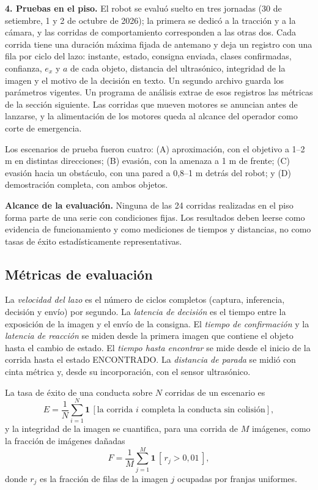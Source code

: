 \documentclass[pdflatex,sn-mathphys-num]{sn-jnl}
\begin{document}
\textbf{4. Pruebas en el piso.} El robot se evalu\'o suelto en tres jornadas
(30 de setiembre, 1 y 2 de octubre de 2026); la primera se dedic\'o a la
tracci\'on y a la c\'amara, y las corridas de comportamiento corresponden a
las otras dos. Cada corrida tiene una duraci\'on
m\'axima fijada de antemano y deja un registro con una fila por ciclo del
lazo: instante, estado, consigna enviada, clases confirmadas, confianza,
$e_x$ y $a$ de cada objeto, distancia del ultras\'onico, integridad de la
imagen y el motivo de la decisi\'on en texto. Un segundo archivo guarda los
par\'ametros vigentes. Un programa de an\'alisis extrae de esos registros las
m\'etricas de la secci\'on siguiente. Las corridas que mueven motores se
anuncian antes de lanzarse, y la alimentaci\'on de los motores queda al
alcance del operador como corte de emergencia.

Los escenarios de prueba fueron cuatro: (A) aproximaci\'on, con el objetivo a
1--2 m en distintas direcciones; (B) evasi\'on, con la amenaza a 1 m de
frente; (C) evasi\'on hacia un obst\'aculo, con una pared a 0,8--1 m detr\'as
del robot; y (D) demostraci\'on completa, con ambos objetos.


\textbf{Alcance de la evaluaci\'on.} Ninguna de las 24 corridas realizadas en el piso
forma parte de una serie con condiciones fijas. Los resultados deben leerse como evidencia de
funcionamiento y como mediciones de tiempos y distancias, no como tasas de
\'exito estad\'isticamente representativas.

\subsection{M\'etricas de evaluaci\'on}

La \emph{velocidad del lazo} es el n\'umero de ciclos completos (captura,
inferencia, decisi\'on y env\'io) por segundo. La \emph{latencia de
decisi\'on} es el tiempo entre la exposici\'on de la imagen y el env\'io de la
consigna. El \emph{tiempo de confirmaci\'on} y la \emph{latencia de
reacci\'on} se miden desde la primera imagen que contiene el objeto hasta el
cambio de estado. El \emph{tiempo hasta encontrar} se mide desde el inicio de
la corrida hasta el estado ENCONTRADO. La \emph{distancia de parada} se
midi\'o con cinta m\'etrica y, desde su incorporaci\'on, con el sensor
ultras\'onico.

La tasa de \'exito de una conducta sobre $N$ corridas de un escenario es
\begin{equation}
  E = \frac{1}{N}\sum_{i=1}^{N} \mathbf{1}\,[\text{la corrida } i
      \text{ completa la conducta sin colisi\'on}],
  \label{eq:exito}
\end{equation}
y la integridad de la imagen se cuantifica, para una corrida de $M$
im\'agenes, como la fracci\'on de im\'agenes da\~nadas
\begin{equation}
  F = \frac{1}{M}\sum_{j=1}^{M} \mathbf{1}\,[\,r_j > 0{,}01\,],
  \label{eq:franjas}
\end{equation}
donde $r_j$ es la fracci\'on de filas de la imagen $j$ ocupadas por franjas
uniformes.
\end{document}
